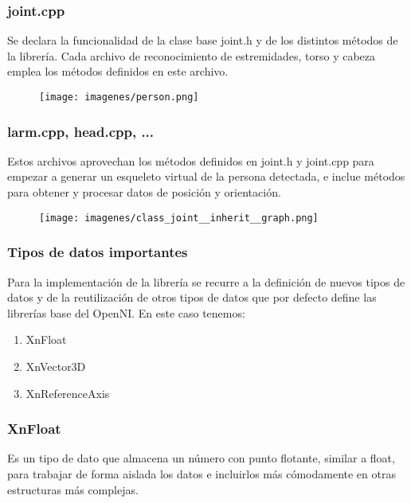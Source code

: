 \documentclass{beamer}
\begin{document}
	\begin{frame}
		\frametitle{joint.cpp}
		Se declara la funcionalidad de la clase base joint.h y de los distintos métodos de la librería. Cada archivo de reconocimiento de estremidades, torso y cabeza emplea los métodos definidos en este archivo.

		\begin{figure}
			\texttt{[image: imagenes/person.png]}
		\end{figure}

	\end{frame}
	\begin{frame}
		\frametitle{larm.cpp, head.cpp, ...}
		Estos  archivos aprovechan los métodos definidos en joint.h y joint.cpp para empezar a generar un esqueleto virtual de la persona detectada, e inclue métodos para obtener y procesar datos  de posición y orientación.
		\begin{figure}
			\texttt{[image: imagenes/class\_joint\_\_inherit\_\_graph.png]}
		\end{figure}

	\end{frame}
	\begin{frame}
		\frametitle{Tipos de datos importantes}
		Para la implementación de la librería se recurre a la definición de nuevos tipos de datos y de la reutilización de otros tipos de datos que por defecto define las librerías base del OpenNI. En este caso tenemos:

		\begin{enumerate}
			\item XnFloat
			\item XnVector3D
			\item XnReferenceAxis
		\end{enumerate}

	\end{frame}
	\begin{frame}
		\frametitle{XnFloat}
		Es un tipo de dato que almacena un número con punto flotante, similar a float, para trabajar de forma aislada los datos e incluirlos más cómodamente en otras estructuras más complejas.
	\end{frame}
\end{document}
